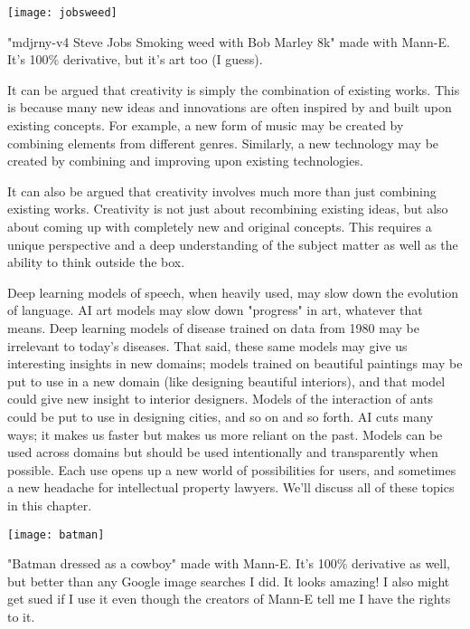 \begin{pdf}
\begin{marginfigure}[-5.5cm]
        \texttt{[image: jobsweed]}
        \caption{"mdjrny-v4 Steve Jobs Smoking weed with Bob Marley 8k" made with Mann-E. It's 100\% derivative, but it's art too (I guess).}
\end{marginfigure}
\end{pdf}

It can be argued that creativity is simply the combination of existing works. This is because many new ideas and innovations are often inspired by and built upon existing concepts. For example, a new form of music may be created by combining elements from different genres. Similarly, a new technology may be created by combining and improving upon existing technologies.

It can also be argued that creativity involves much more than just combining existing works. Creativity is not just about recombining existing ideas, but also about coming up with completely new and original concepts. This requires a unique perspective and a deep understanding of the subject matter as well as the ability to think outside the box.

Deep learning models of speech, when heavily used, may slow down the evolution of language. AI art models may slow down "progress" in art, whatever that means. Deep learning models of disease trained on data from 1980 may be irrelevant to today’s diseases. That said, these same models may give us interesting insights in new domains; models trained on beautiful paintings may be put to use in a new domain (like designing beautiful interiors), and that model could give new insight to interior designers. Models of the interaction of ants could be put to use in designing cities, and so on and so forth. AI cuts many ways; it makes us faster but makes us more reliant on the past. Models can be used across domains but should be used intentionally and transparently when possible. Each use opens up a new world of possibilities for users, and sometimes a new headache for intellectual property lawyers. We’ll discuss all of these topics in this chapter.

\begin{pdf}
\begin{marginfigure}[-5.5cm]
        \texttt{[image: batman]}
        \caption{"Batman dressed as a cowboy" made with Mann-E. It's 100\% derivative as well, but better than any Google image searches I did. It looks amazing! I also might get sued if I use it even though the creators of Mann-E tell me I have the rights to it.}
\end{marginfigure}
\end{pdf}

